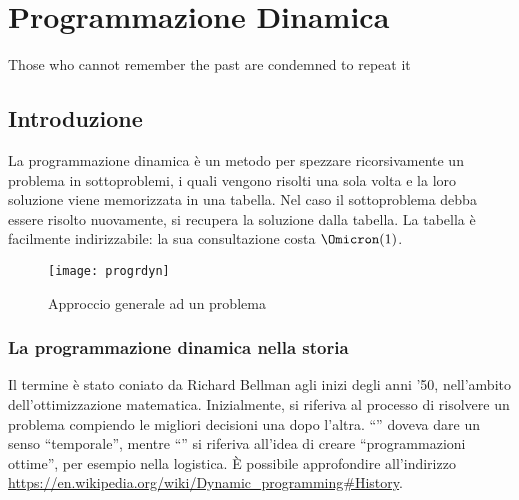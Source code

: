 
\ifsubfile
\usepackage[newfloat, cachedir=_minted-cache, outputdir=../build]{minted}
\usepackage{../libraries/set-minted}

\pagestyle{plain}
\setcounter{chapter}{12}


\fi
\chapter{Programmazione Dinamica}
\begin{fquote}
Those who cannot remember the past are condemned to repeat it
\end{fquote}

\section*{Introduzione}

La programmazione dinamica è un metodo per spezzare ricorsivamente un problema in
sottoproblemi, i quali vengono risolti una sola volta e la loro soluzione viene memorizzata in una tabella.
Nel caso il sottoproblema debba essere risolto nuovamente, si recupera la soluzione dalla tabella.
La tabella è facilmente indirizzabile: la sua consultazione costa \(\Omicron(1)\).

\begin{figure}[H]\centering
    \texttt{[image: progrdyn]}
    \caption{Approccio generale ad un problema}
\end{figure}

\subsection*{La programmazione dinamica nella storia}

Il termine  è stato coniato da Richard Bellman agli inizi degli anni '50, nell'ambito dell'ottimizzazione matematica.
Inizialmente, si riferiva al processo di risolvere un problema compiendo le migliori decisioni una dopo l'altra.
\enquote{} doveva dare un senso \enquote{temporale}, mentre \enquote{} si riferiva all'idea di creare \enquote{programmazioni ottime}, per esempio nella logistica.
\`{E} possibile approfondire all'indirizzo \url{https://en.wikipedia.org/wiki/Dynamic_programming#History}.


